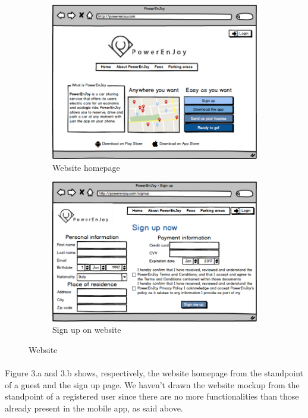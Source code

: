 	\begin{figure}
		\begin{subfigure}{1\textwidth}
			\includegraphics[scale=0.50]{img/mockups/Website.png}
			\caption{Website homepage}
			\label{fig:subim1}
		\end{subfigure}
		\begin{subfigure}{1\textwidth}
			\includegraphics[scale=0.50]{img/mockups/Sign_up.png}
			\caption{Sign up on website}
			\label{fig:subim2}
		\end{subfigure}
		
		\caption{Website}
		\label{fig:image3}
	\end{figure}

	\paragraph{} Figure 3.a and 3.b shows, respectively, the website homepage from the standpoint of a guest and the sign up page. We haven't drawn the website mockup from the standpoint of a registered user since there are no more functionalities than those already present in the mobile app, as said above.



\FloatBarrier %